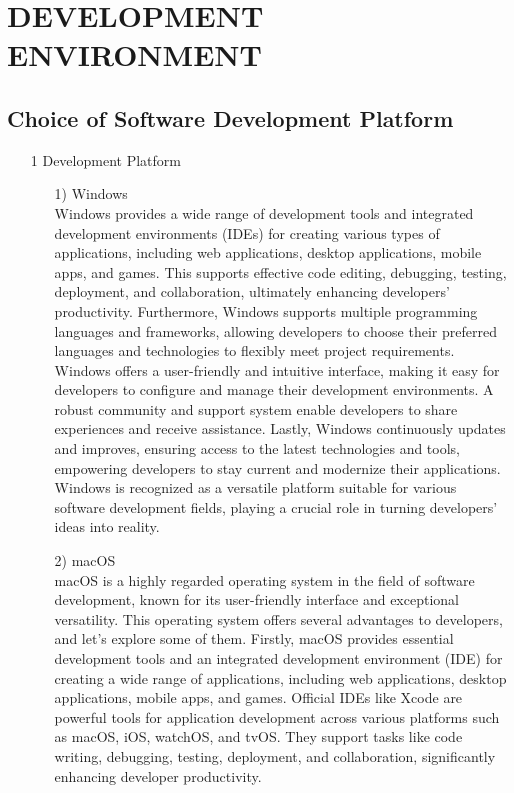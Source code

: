 \documentclass[conference]{IEEEtran}
\begin{document}
\section{DEVELOPMENT ENVIRONMENT}

\subsection{Choice of Software Development Platform}
\begin{enumerate}
\item[1] Development Platform
\begin{itemize}
\item [1)] Windows\\
Windows provides a wide range of development tools and integrated development environments (IDEs) for creating various types of applications, including web applications, desktop applications, mobile apps, and games. This supports effective code editing, debugging, testing, deployment, and collaboration, ultimately enhancing developers' productivity.
Furthermore, Windows supports multiple programming languages and frameworks, allowing developers to choose their preferred languages and technologies to flexibly meet project requirements.
Windows offers a user-friendly and intuitive interface, making it easy for developers to configure and manage their development environments. A robust community and support system enable developers to share experiences and receive assistance.
Lastly, Windows continuously updates and improves, ensuring access to the latest technologies and tools, empowering developers to stay current and modernize their applications. Windows is recognized as a versatile platform suitable for various software development fields, playing a crucial role in turning developers' ideas into reality.
\item [2)] macOS\\
macOS is a highly regarded operating system in the field of software development, known for its user-friendly interface and exceptional versatility. This operating system offers several advantages to developers, and let's explore some of them. Firstly, macOS provides essential development tools and an integrated development environment (IDE) for creating a wide range of applications, including web applications, desktop applications, mobile apps, and games. Official IDEs like Xcode are powerful tools for application development across various platforms such as macOS, iOS, watchOS, and tvOS. They support tasks like code writing, debugging, testing, deployment, and collaboration, significantly enhancing developer productivity.

\end{itemize}
\end{enumerate}
\end{document}

